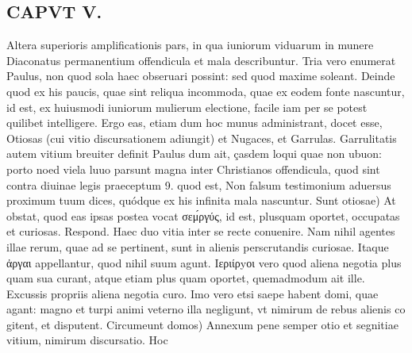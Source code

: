 \documentclass{article}
\begin{document}
\begin{pages}
\section*{CAPVT  V. }
\marginpar{[ p.285 ]}\pstart Altera superioris amplificationis pars, in qua iuniorum viduarum in munere Diaconatus permanentium offendicula et mala describuntur. Tria vero enumerat Paulus, non quod sola haec obseruari possint: sed quod maxime soleant. Deinde quod ex his paucis, quae sint reliqua incommoda, quae ex eodem fonte nascuntur, id est, ex huiusmodi iuniorum mulierum electione, facile iam per se potest quilibet intelligere. Ergo eas, etiam dum hoc munus administrant, docet esse, Otiosas (cui vitio discursationem adiungit) et Nugaces, et Garrulas. Garrulitatis autem vitium breuiter definit Paulus dum ait, çasdem loqui quae non ubuon: porto noed viela luuo parsunt magna inter Christianos offendicula, quod sint contra diuinae legis praeceptum 9. quod est, Non falsum testimonium aduersus proximum tuum dices, quódque ex his infinita mala nascuntur.  \pend\pstart Sunt otiosae) At obstat, quod eas ipsas postea vocat σεμ́ργύς, id est, plusquam oportet, occupatas et curiosas. Respond. Haec duo vitia inter se recte conuenire. Nam nihil agentes illae rerum, quae ad se pertinent, sunt in alienis perscrutandis curiosae. Itaque ἀργαι appellantur, quod nihil suum agunt. Iεριίρyοι vero quod aliena negotia plus quam sua curant, atque etiam plus quam oportet, quemadmodum ait ille. Excussis propriis aliena negotia curo. Imo vero etsi saepe habent domi, quae agant: magno et turpi animi veterno illa negligunt, vt nimirum de rebus alienis co gitent, et disputent.  \pend\pstart Circumeunt domos) Annexum pene semper otio et segnitiae vitium, nimirum discursatio. Hoc  \pend

\end{pages}
\end{document}
